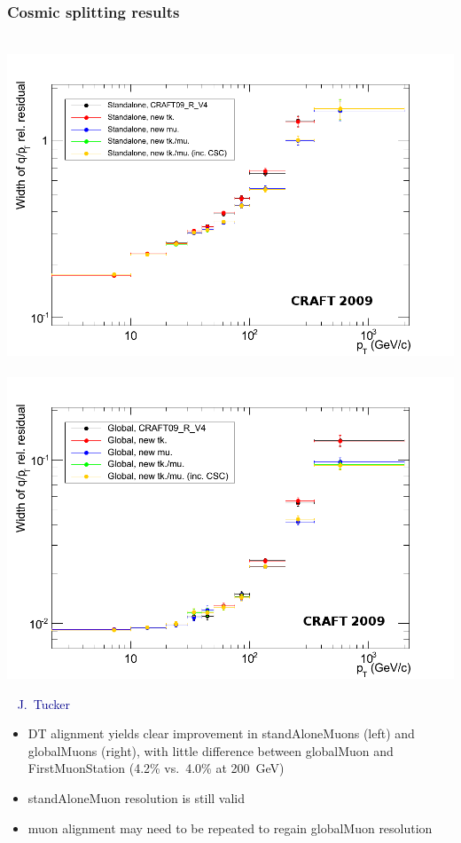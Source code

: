 \documentclass[compress]{beamer}
\begin{document}
\begin{frame}
\frametitle{Cosmic splitting results}

\mbox{\hspace{-0.85 cm}
\includegraphics[width=0.6\linewidth]{StandAlone.png}
\includegraphics[width=0.6\linewidth]{GlobalMuon.png}}

\mbox{ } \hfill {\scriptsize \textcolor{darkblue}{J.~Tucker}}

\vfill
\begin{itemize}
\item DT alignment yields clear improvement in standAloneMuons (left)
  and globalMuons (right), with little difference between globalMuon
  and FirstMuonStation (4.2\% vs.\ 4.0\% at 200~GeV)
\item standAloneMuon resolution is still valid
\item muon alignment may need to be repeated to regain globalMuon resolution
\end{itemize}
\end{frame}
\end{document}
